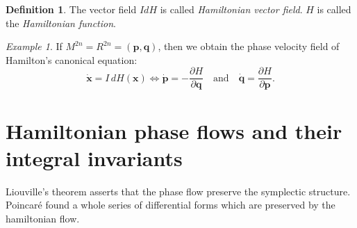 \documentclass{book}
\numberwithin{equation}{section}
\theoremstyle{plain}
\theoremstyle{definition}
\newtheorem*{defn*}{Definition}
\theoremstyle{remark}
\theoremstyle{remark}
\newtheorem*{ex*}{Example}
\begin{document}
\begin{defn*}
%
The vector field $IdH$ is called \emph{Hamiltonian vector field}.
%
$H$ is called the \emph{Hamiltonian function}.
\end{defn*}

\begin{ex*}
  If $M^{2n} = R^{2n} = {(\mathbf p, \mathbf q)}$,
  then we obtain the phase velocity field
  of Hamilton's canonical equation:
  $$
  \dot{\mathbf x} = I\,dH(\mathbf x)
  \Longleftrightarrow
  \dot{\mathbf p} = - \frac{\partial H }{ \partial \mathbf q}
  \mathrm{\quad and \quad}
  \dot{\mathbf q} = \frac{\partial H}{\partial \mathbf p}.
  $$
\end{ex*}


\section{Hamiltonian phase flows and their integral invariants}

Liouville's theorem asserts that the phase flow
preserve the symplectic structure.
%
Poincar\'e found a whole series of differential forms
which are preserved by the hamiltonian flow.

\end{document}
